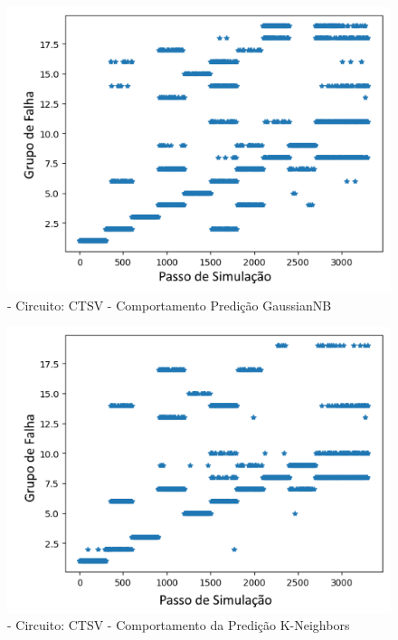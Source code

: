         \begin{figure}[H]
        \begin{center}
        \includegraphics[width=13cm]{./01_Pre_textuais/ctsv_figs/GaussianNB_CTSV_mc_+_4bitPRBS_[FALHA]raw.png}
        \caption{\label{fig:DecisionTreeClassifieSalenkey}- Circuito: CTSV - Comportamento Predição GaussianNB}
        \end{center}
        \end{figure}
        
        
        \begin{figure}[H]
        \begin{center}
        \includegraphics[width=13cm]{./01_Pre_textuais/ctsv_figs/KNeighborsClassifier_CTSV_mc_+_4bitPRBS_[FALHA]raw.png}
        \caption{\label{fig:DecisionTreeClassifieSalenkey}- Circuito: CTSV - Comportamento da Predição K-Neighbors }
        \end{center}
        \end{figure}
        
